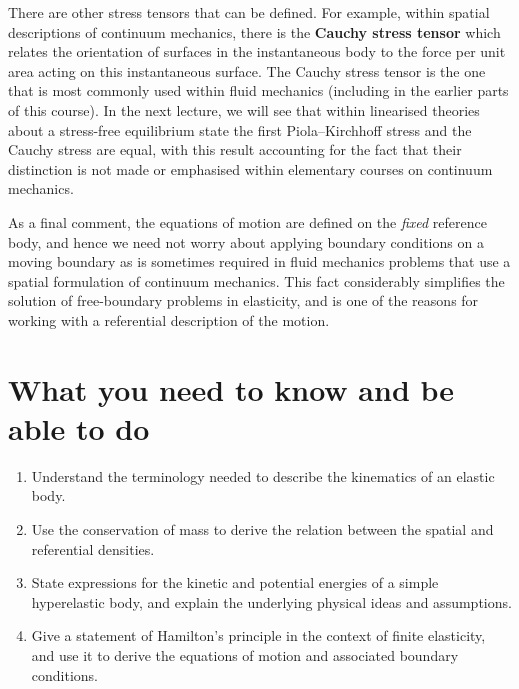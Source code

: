 There are other stress tensors that can be defined. For example, within spatial descriptions of continuum mechanics, 
there is the \textbf{Cauchy stress tensor} which relates the orientation of surfaces in the instantaneous body 
to the force per unit area acting on this instantaneous surface. The Cauchy stress tensor is the one that 
is most commonly used within fluid mechanics (including in the earlier parts of this course). In the next lecture, 
we will see that within linearised theories about a stress-free equilibrium state the first Piola--Kirchhoff
stress and the Cauchy stress are equal, with this result accounting for the fact that their distinction 
is not made or emphasised within elementary courses on continuum mechanics. 


As a final comment, 
the equations of motion are defined on the \emph{fixed} reference body, and hence we need not worry about applying 
boundary conditions on a moving boundary as is sometimes required in fluid mechanics problems that use a spatial formulation 
of continuum mechanics. This fact considerably simplifies 
the solution of free-boundary problems in elasticity, and is one of the reasons for working with a referential description 
of the motion.

\section*{What you need to know and be able to do}
\begin{enumerate}
    \item[(i)] Understand the terminology needed to describe the kinematics of an elastic body.
    \item[(ii)] Use the conservation of mass to derive the relation between the spatial and referential densities.
    \item[(iii)] State expressions for the kinetic and potential energies of a simple hyperelastic body, and 
    explain the underlying physical ideas and assumptions.
    \item[(iv)] Give a statement of Hamilton's principle in the context of finite elasticity, and use it to derive 
    the equations of motion and associated boundary conditions.
\end{enumerate}
